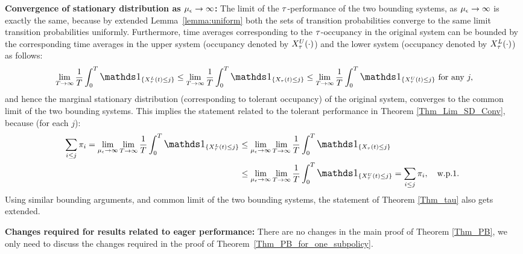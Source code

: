 {{\bf Convergence of stationary distribution as ${\mu_\epsilon}\to \infty$:} The
limit of the ${\tau}$-performance of the two bounding systems, as
${\mu_\epsilon} \to \infty$ is exactly the same, because by extended
Lemma~\ref{lemma:uniform} both the sets of transition probabilities
converge to the same limit transition probabilities uniformly.
Furthermore, time averages corresponding to the ${\tau}$-occupancy in the
original system can be bounded by the corresponding time averages in
the upper system (occupancy denoted by $X_{\tau}^U (\cdot)$) and the lower
system (occupancy denoted by $X_{\tau}^L (\cdot)$) as follows:
$$
\lim_{T \to \infty} \frac{1}{T} \int_0^T \indc_{ \{X^{L}_\tau(t) \le j
  \}} \le \lim_{T \to \infty} \frac{1}{T} \int_0^T \indc_{ \{X_\tau(t)
  \le j \}} \le \lim_{T \to \infty} \frac{1}{T} \int_0^T \indc_{
  \{X^U_\tau(t) \le j \}} \mbox{ for any } j,
$$
and hence the marginal stationary distribution (corresponding to
tolerant occupancy) of the original system, converges to the common
limit of the two bounding systems. This implies the statement related
to the tolerant performance in Theorem \ref{Thm_Lim_SD_Conv}, because
(for each $j$):
\begin{eqnarray*}
\sum_{i\le j} \pi_i  = \lim_{\mue \to \infty } \lim_{T \to \infty}  \frac{1}{T} \int_0^T  \indc_{ \{X^{L}_\tau(t) \le  j \}}  \le  \lim_{\mue \to \infty }    \lim_{T \to \infty}  \frac{1}{T} \int_0^T  \indc_{ \{X_\tau(t) \le  j \}}  \hspace{30mm}  \\
 \le
 \lim_{\mue \to \infty }   \lim_{T \to \infty}  \frac{1}{T} \int_0^T  \indc_{ \{X^U_\tau(t) \le  j \}} =  \sum_{i \le j} \pi_i, \  \    \mbox{ w.p.1. }
\end{eqnarray*}
Using similar bounding arguments, and common limit of the two bounding
systems, the statement of Theorem \ref{Thm_tau} also gets extended.


{\bf Changes required for results related to eager performance:} There
are no changes in the main proof of Theorem \ref{Thm_PB}, we only need
to discuss the changes required in the proof of
Theorem~\ref{Thm_PB_for_one_subpolicy}.

}
